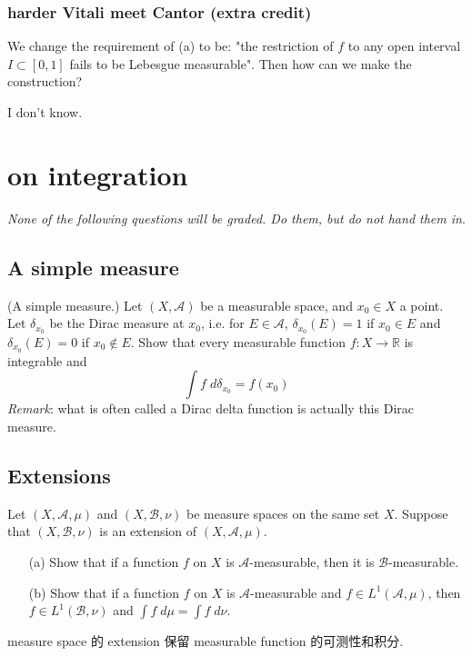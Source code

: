 \documentclass[lang=cn,11pt]{elegantbook}
\begin{document}
\subsection{harder Vitali meet Cantor (extra credit)}
We change the requirement of (a) to be: "the restriction of $f$ to any open interval $I\subset[0,1]$ fails to be Lebesgue measurable". Then how can we make the construction?
\begin{solution}
    I don't know.
\end{solution}






\chapter{on integration}
\begin{center}
\textit{None of the following questions will be graded. Do them, but do not hand them in}.
\end{center}

\section{A simple measure}

(A simple measure.) 
  Let $(X,\mathcal{A})$ be a measurable space, and $x_0\in X$ a point. 
  Let $\delta_{x_0}$ be the Dirac measure at $x_0$, i.e. for $E\in \mathcal{A}$, $\delta_{x_0}(E)=1$ if $x_0\in E$ and $\delta_{x_0}(E)=0$ if $x_0\notin E$. 
Show that every measurable function $f\colon X\to \mathbb{R}$ is integrable and 
\[
	\int f \; d\delta_{x_0}= f(x_0) 
\]
\textit{Remark}: what is often called a Dirac delta function is actually this Dirac measure. 

\section{Extensions}  
  Let $(X,\mathcal{A},\mu)$ and $(X,\mathcal{B},\nu)$ be measure spaces on the same set $X$. Suppose that $(X,\mathcal{B},\nu)$ is an extension of $(X,\mathcal{A},\mu)$. 
  \begin{itemize}
  \item[(a)] Show that if a function $f$ on $X$ is $\mathcal{A}$-measurable, then it is $\mathcal{B}$-measurable.
  \item[(b)] Show that if a function $f$ on $X$ is $\mathcal{A}$-measurable and $f\in L^1(\mathcal{A}, \mu)$, then $f\in L^1(\mathcal{B},\nu)$ and $\int f \; d\mu= \int f\; d \nu$. 
  \end{itemize}
\begin{remark}
    measure space 的 extension 保留 measurable function 的可测性和积分.
\end{remark}
\end{document}
